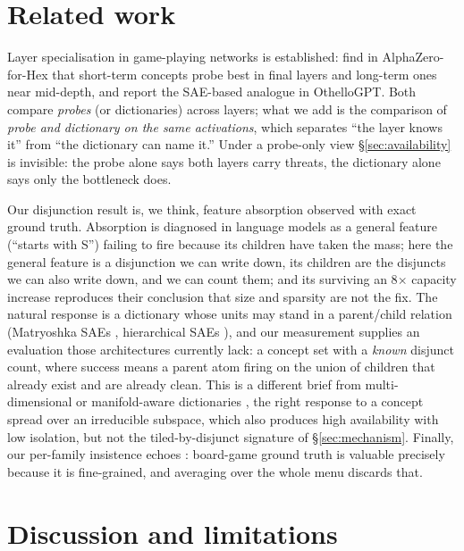 \documentclass{article}
\begin{document}
\section{Related work}
\label{sec:related}

Layer specialisation in game-playing networks is established:
\citet{lovering2022evaluation} find in AlphaZero-for-Hex that short-term
concepts probe best in final layers and long-term ones near mid-depth, and
\citet{du2025gpt} report the SAE-based analogue in OthelloGPT. Both compare
\emph{probes} (or dictionaries) across layers; what we add is the comparison of
\emph{probe and dictionary on the same activations}, which separates ``the layer
knows it'' from ``the dictionary can name it.'' Under a probe-only view
\S\ref{sec:availability} is invisible: the probe alone says both layers carry
threats, the dictionary alone says only the bottleneck does.

Our disjunction result is, we think, feature absorption
\citep{chanin2024absorption} observed with exact ground truth. Absorption is
diagnosed in language models as a general feature (``starts with S'') failing to
fire because its children have taken the mass; here the general feature is a
disjunction we can write down, its children are the disjuncts we can also write
down, and we can count them; and its surviving an 8$\times$ capacity increase
reproduces their conclusion that size and sparsity are not the fix. The natural
response is a dictionary whose units may stand in a parent/child
relation (Matryoshka SAEs \citep{bussmann2025matryoshka}, hierarchical SAEs
\citep{muchane2025hierarchical}), and our measurement supplies an evaluation
those architectures currently lack: a concept set with a \emph{known} disjunct
count, where success means a parent atom firing on the union of children that
already exist and are already clean. This is a different brief from
multi-dimensional or manifold-aware dictionaries
\citep{engels2024notall,park2024geometry}, the right response to a concept
spread over an irreducible subspace, which also produces high availability with
low isolation, but not the tiled-by-disjunct signature of
\S\ref{sec:mechanism}. Finally, our per-family insistence echoes
\citet{karvonen2024measuring}: board-game ground truth is valuable precisely
because it is fine-grained, and averaging over the whole menu discards that.

\section{Discussion and limitations}
\label{sec:discussion}
\end{document}
